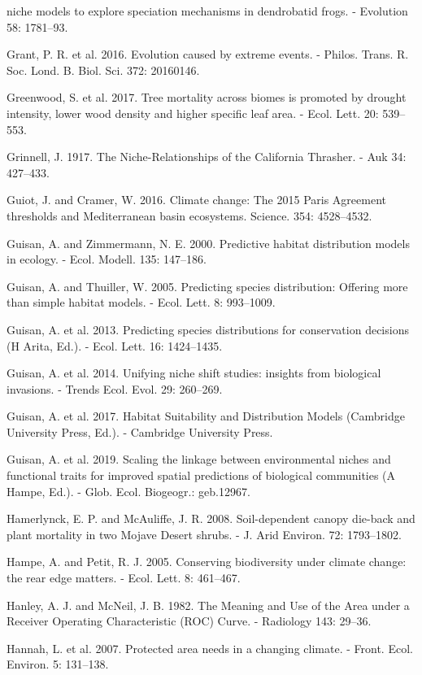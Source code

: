 \documentclass[11pt,twoside]{reedthesis}
\begin{document}
niche models to explore speciation mechanisms in dendrobatid frogs. -
Evolution 58: 1781--93.\par
Grant, P. R. et al. 2016. Evolution caused by extreme events. - Philos.
Trans. R. Soc. Lond. B. Biol. Sci. 372: 20160146.\par
Greenwood, S. et al. 2017. Tree mortality across biomes is promoted by
drought intensity, lower wood density and higher specific leaf area. -
Ecol. Lett. 20: 539--553.\par
Grinnell, J. 1917. The Niche-Relationships of the California Thrasher. -
Auk 34: 427--433.\par
Guiot, J. and Cramer, W. 2016. Climate change: The 2015 Paris Agreement
thresholds and Mediterranean basin ecosystems. Science. 354:
4528--4532.\par
Guisan, A. and Zimmermann, N. E. 2000. Predictive habitat distribution
models in ecology. - Ecol. Modell. 135: 147--186.\par
Guisan, A. and Thuiller, W. 2005. Predicting species distribution:
Offering more than simple habitat models. - Ecol. Lett. 8:
993--1009.\par
Guisan, A. et al. 2013. Predicting species distributions for
conservation decisions (H Arita, Ed.). - Ecol. Lett. 16: 1424--1435.\par
Guisan, A. et al. 2014. Unifying niche shift studies: insights from
biological invasions. - Trends Ecol. Evol. 29: 260--269.\par
Guisan, A. et al. 2017. Habitat Suitability and Distribution Models
(Cambridge University Press, Ed.). - Cambridge University Press.\par
Guisan, A. et al. 2019. Scaling the linkage between environmental niches
and functional traits for improved spatial predictions of biological
communities (A Hampe, Ed.). - Glob. Ecol. Biogeogr.: geb.12967.\par
Hamerlynck, E. P. and McAuliffe, J. R. 2008. Soil-dependent canopy
die-back and plant mortality in two Mojave Desert shrubs. - J. Arid
Environ. 72: 1793--1802.\par
Hampe, A. and Petit, R. J. 2005. Conserving biodiversity under climate
change: the rear edge matters. - Ecol. Lett. 8: 461--467.\par
Hanley, A. J. and McNeil, J. B. 1982. The Meaning and Use of the Area
under a Receiver Operating Characteristic (ROC) Curve. - Radiology 143:
29--36.\par
Hannah, L. et al. 2007. Protected area needs in a changing climate. -
Front. Ecol. Environ. 5: 131--138.\par
\end{document}
